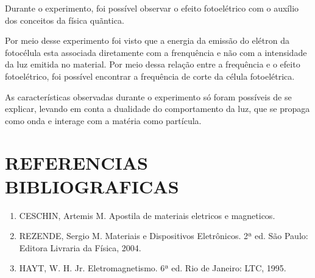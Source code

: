 \documentclass[10pt,twocolumn,letterpaper]{article}
\begin{document}
\hspace{1cm} Durante o experimento, foi possível observar o efeito fotoelétrico com o auxílio dos conceitos da física quãntica.

\hspace{1cm} Por meio desse experimento foi visto que a energia da emissão do elétron da fotocélula esta associada diretamente com a frenquência e não com a intensidade da luz emitida no material. Por meio dessa relação entre a frequência e o efeito fotoelétrico, foi possível encontrar a frequência de corte da célula fotoelétrica.

\hspace{1cm} As características observadas durante o experimento só foram possíveis de se explicar, levando em conta a dualidade do comportamento da luz, que se propaga como onda e interage com a matéria como partícula.

\section{REFERENCIAS BIBLIOGRAFICAS}

{\small
\begin{enumerate}

    \item CESCHIN, Artemis M. Apostila de materiais eletricos e magneticos.

    \item REZENDE, Sergio M. Materiais e Dispositivos Eletrônicos. 2ª ed. São Paulo: Editora Livraria da Física, 2004.

    \item HAYT, W. H. Jr. Eletromagnetismo. 6ª ed. Rio de Janeiro: LTC, 1995.
    
\end{enumerate}
}
\end{document}
